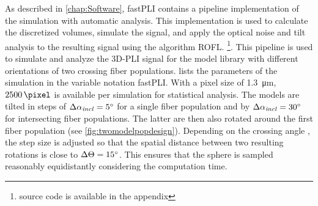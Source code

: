 %
%
%
As described in \cref{chap:Software}, \ac{fastPLI} contains a pipeline implementation of the simulation with automatic analysis.
This implementation is used to calculate the discretized volumes, simulate the signal, and apply the optical noise and tilt analysis to the resulting signal using the algorithm \ac{ROFL}. \footnote{source code is available in the appendix \dummy{}}.
This pipeline is used to simulate and analyze the \ac{3D-PLI} signal for the model library with different orientations of two crossing fiber populations.
 lists the parameters of the simulation in the variable notation \ac{fastPLI}.
With a pixel size of \SI{1.3}{\micro\meter}, $\SI{2500}{\pixel}$ is available per simulation for statistical analysis.
The models are tilted in steps of $\Delta \textnormal{$\alpha_{\mathit{incl}}$} = \SI{5}{\degree}$ for a single fiber population and by $\Delta \textnormal{$\alpha_{\mathit{incl}}$} = \SI{30}{\degree}$ for intersecting fiber populations. The latter are then also rotated around the first fiber population (see \cref{fig:twomodelpopdesign}).
Depending on the crossing angle \modelOmega{}, the step size is adjusted so that the spatial distance between two resulting rotations is close to $\Delta \textnormal{$\Theta$} = \SI{15}{\degree}$.
This ensures that the sphere is sampled reasonably equidistantly considering the computation time.
%
%
%
